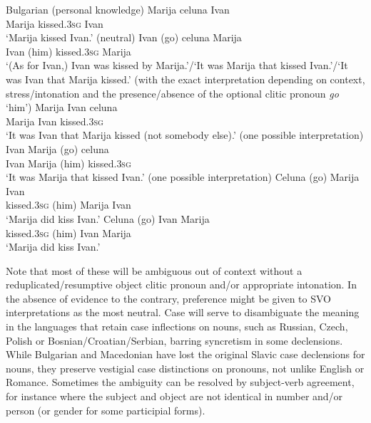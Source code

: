 \documentclass[output=paper,hidelinks]{langscibook}
\begin{document}
\ea Bulgarian (personal knowledge)%
    \label{ex:Slavic:1}
    \ea\label{ex:Slavic:1a}
    {\gll Marija   celuna     Ivan \\
        Marija     kissed.\textsc{3sg}    Ivan\\}\jambox{[SVO]}
    \glt`Marija kissed Ivan.' (neutral)
    \ex\label{ex:Slavic:1b}
    {\gll Ivan   (go)   celuna     Marija\\
        Ivan   (him)   kissed.\textsc{3sg}    Marija \\}\jambox{[OVS]}
    \glt `(As for Ivan,) Ivan was kissed by Marija.'/`It was Marija that kissed Ivan.'/`It was Ivan that Marija kissed.' (with the exact interpretation depending on context, stress/intonation and the presence/absence of the optional clitic pronoun \textit{go} `him')
     \ex\label{ex:Slavic:1c}
    {\gll Marija   Ivan   celuna\\
        Marija     Ivan   kissed.\textsc{3sg}\\}\jambox{[SOV]}
    \glt `It was Ivan that Marija kissed (not somebody else).' (one possible interpretation)
     \ex\label{ex:Slavic:1d}
    {\gll Ivan   Marija   (go)   celuna\\
        Ivan   Marija     (him)   kissed.\textsc{3sg}\\}\jambox{[OSV] }
    \glt `It was Marija that kissed Ivan.' (one possible interpretation)
     \ex\label{ex:Slavic:1e}
    {\gll Celuna   (go)   Marija   Ivan\\
        kissed.\textsc{3sg}    (him)   Marija     Ivan\\}\jambox{[VSO]}
    \glt`Marija did kiss Ivan.'
     \ex\label{ex:Slavic:1f}
    {\gll Celuna   (go)   Ivan   Marija\\
        kissed.\textsc{3sg}   (him)   Ivan   Marija\\}\jambox{[VOS]}
    \glt `Marija did kiss Ivan.' 
    \z\z

Note that most of these will be ambiguous out of context without a reduplicated/resumptive object clitic pronoun and/or appropriate intonation. In the absence of evidence to the contrary, preference might be given to SVO interpretations as the most neutral. Case will serve to disambiguate the meaning in the languages that retain case inflections on nouns, such as Russian, Czech, Polish or Bosnian/Croatian/Serbian, barring syncretism in some declensions. While Bulgarian and Macedonian have lost the original Slavic case declensions for nouns, they preserve vestigial case distinctions on pronouns, not unlike English or Romance. Sometimes the ambiguity can be resolved by subject-verb agreement, for instance where the subject and object are not identical in number and/or person (or gender for some participial forms).
\end{document}
